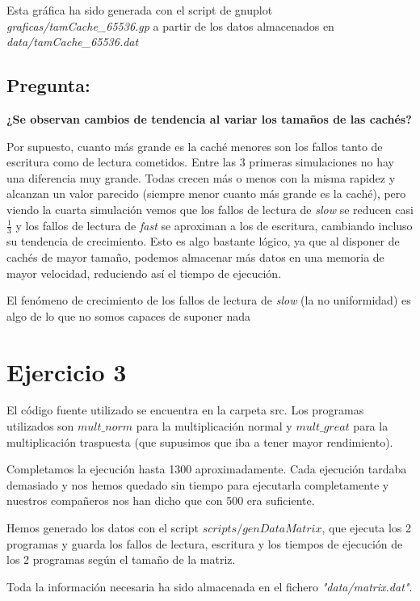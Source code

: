 \documentclass[nochap]{apuntes}
\begin{document}
Esta gráfica ha sido generada con el script de gnuplot \emph{graficas/tamCache\_65536.gp} a partir de los datos almacenados en \emph{data/tamCache\_65536.dat}


\subsection{Pregunta: } \textbf{¿Se observan cambios de tendencia al variar los tamaños de las cachés?}

Por supuesto, cuanto más grande es la caché menores son los fallos tanto de escritura como de lectura cometidos. Entre las 3 primeras simulaciones no hay una diferencia muy grande. Todas crecen más o menos con la misma rapidez y alcanzan un valor parecido (siempre menor cuanto más grande es la caché), pero viendo la cuarta simulación vemos que los fallos de lectura de \emph{slow} se reducen casi $\frac{1}{3}$ y los fallos de lectura de \emph{fast} se aproximan a los de escritura, cambiando incluso su tendencia de crecimiento. Esto es algo bastante lógico, ya que al disponer de cachés de mayor tamaño, podemos almacenar más datos en una memoria de mayor velocidad, reduciendo así el tiempo de ejecución.

El fenómeno de crecimiento de los fallos de lectura de \emph{slow} (la no uniformidad) es algo de lo que no somos capaces de suponer nada 
\section{Ejercicio 3}

El código fuente utilizado se encuentra en la carpeta src. Los programas utilizados son $mult\_norm$ para la multiplicación normal y $mult\_great$ para la multiplicación traspuesta (que supusimos que iba a tener mayor rendimiento).

Completamos la ejecución hasta 1300 aproximadamente. Cada ejecución tardaba demasiado y nos hemos quedado sin tiempo para ejecutarla completamente y nuestros compañeros nos han dicho que con 500 era suficiente.

Hemos generado los datos con el script $scripts/genDataMatrix$, que ejecuta los 2 programas y guarda los fallos de lectura, escritura y los tiempos de ejecución de los 2 programas según el tamaño de la matriz.

Toda la información necesaria ha sido almacenada en el fichero \emph{"data/matrix.dat"}.
\end{document}
